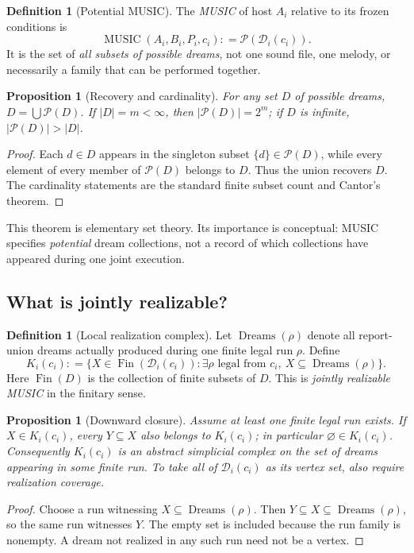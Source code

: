 \documentclass[11pt,letterpaper]{article}
\newtheorem{proposition}[theorem]{Proposition}
\theoremstyle{definition}
\newtheorem{definition}[theorem]{Definition}
\theoremstyle{remark}
\newcommand{\PSet}{\mathcal{P}}
\newcommand{\Fin}{\operatorname{Fin}}
\newcommand{\Dream}{\mathcal{D}}
\newcommand{\Music}{\operatorname{MUSIC}}
\newcommand{\defeq}{\mathrel{\mathop:}=}
\begin{document}
\begin{definition}[Potential MUSIC]
The \emph{MUSIC} of host $A_i$ relative to its frozen conditions is
\begin{equation}\label{eq:music}
\boxed{\Music(A_i,B_i,P_i,c_i)\defeq\PSet(\Dream_i(c_i)).}
\end{equation}
It is the set of \emph{all subsets of possible dreams}, not one sound file, one melody, or necessarily a family that can be performed together.
\end{definition}

\begin{proposition}[Recovery and cardinality]
For any set $D$ of possible dreams, $D=\bigcup\PSet(D)$. If $|D|=m<\infty$, then $|\PSet(D)|=2^m$; if $D$ is infinite, $|\PSet(D)|>|D|$.
\end{proposition}
\begin{proof}
Each $d\in D$ appears in the singleton subset $\{d\}\in\PSet(D)$, while every element of every member of $\PSet(D)$ belongs to $D$. Thus the union recovers $D$. The cardinality statements are the standard finite subset count and Cantor's theorem.
\end{proof}

This theorem is elementary set theory. Its importance is conceptual: MUSIC specifies \emph{potential} dream collections, not a record of which collections have appeared during one joint execution.

\subsection{What is jointly realizable?}
\begin{definition}[Local realization complex]
Let $\operatorname{Dreams}(\rho)$ denote all report-union dreams actually produced during one finite legal run $\rho$. Define
\begin{equation}\label{eq:localcomplex}
K_i(c_i)\defeq\{X\in\Fin(\Dream_i(c_i)):\exists\rho\text{ legal from }c_i,\ X\subseteq\operatorname{Dreams}(\rho)\}.
\end{equation}
Here $\Fin(D)$ is the collection of finite subsets of $D$. This is \emph{jointly realizable MUSIC} in the finitary sense.
\end{definition}

\begin{proposition}[Downward closure]
Assume at least one finite legal run exists. If $X\in K_i(c_i)$, every $Y\subseteq X$ also belongs to $K_i(c_i)$; in particular $\varnothing\in K_i(c_i)$. Consequently $K_i(c_i)$ is an abstract simplicial complex on the set of dreams appearing in some finite run. To take all of $\Dream_i(c_i)$ as its vertex set, also require realization coverage.
\end{proposition}
\begin{proof}
Choose a run witnessing $X\subseteq\operatorname{Dreams}(\rho)$. Then $Y\subseteq X\subseteq\operatorname{Dreams}(\rho)$, so the same run witnesses $Y$. The empty set is included because the run family is nonempty. A dream not realized in any such run need not be a vertex.
\end{proof}
\end{document}
